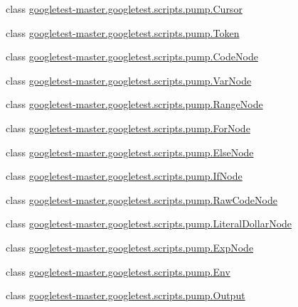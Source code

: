\begin{DoxyCompactItemize}
\item 
class \mbox{\hyperlink{classgoogletest-master_1_1googletest_1_1scripts_1_1pump_1_1_cursor}{googletest-\/master.\+googletest.\+scripts.\+pump.\+Cursor}}
\item 
class \mbox{\hyperlink{classgoogletest-master_1_1googletest_1_1scripts_1_1pump_1_1_token}{googletest-\/master.\+googletest.\+scripts.\+pump.\+Token}}
\item 
class \mbox{\hyperlink{classgoogletest-master_1_1googletest_1_1scripts_1_1pump_1_1_code_node}{googletest-\/master.\+googletest.\+scripts.\+pump.\+Code\+Node}}
\item 
class \mbox{\hyperlink{classgoogletest-master_1_1googletest_1_1scripts_1_1pump_1_1_var_node}{googletest-\/master.\+googletest.\+scripts.\+pump.\+Var\+Node}}
\item 
class \mbox{\hyperlink{classgoogletest-master_1_1googletest_1_1scripts_1_1pump_1_1_range_node}{googletest-\/master.\+googletest.\+scripts.\+pump.\+Range\+Node}}
\item 
class \mbox{\hyperlink{classgoogletest-master_1_1googletest_1_1scripts_1_1pump_1_1_for_node}{googletest-\/master.\+googletest.\+scripts.\+pump.\+For\+Node}}
\item 
class \mbox{\hyperlink{classgoogletest-master_1_1googletest_1_1scripts_1_1pump_1_1_else_node}{googletest-\/master.\+googletest.\+scripts.\+pump.\+Else\+Node}}
\item 
class \mbox{\hyperlink{classgoogletest-master_1_1googletest_1_1scripts_1_1pump_1_1_if_node}{googletest-\/master.\+googletest.\+scripts.\+pump.\+If\+Node}}
\item 
class \mbox{\hyperlink{classgoogletest-master_1_1googletest_1_1scripts_1_1pump_1_1_raw_code_node}{googletest-\/master.\+googletest.\+scripts.\+pump.\+Raw\+Code\+Node}}
\item 
class \mbox{\hyperlink{classgoogletest-master_1_1googletest_1_1scripts_1_1pump_1_1_literal_dollar_node}{googletest-\/master.\+googletest.\+scripts.\+pump.\+Literal\+Dollar\+Node}}
\item 
class \mbox{\hyperlink{classgoogletest-master_1_1googletest_1_1scripts_1_1pump_1_1_exp_node}{googletest-\/master.\+googletest.\+scripts.\+pump.\+Exp\+Node}}
\item 
class \mbox{\hyperlink{classgoogletest-master_1_1googletest_1_1scripts_1_1pump_1_1_env}{googletest-\/master.\+googletest.\+scripts.\+pump.\+Env}}
\item 
class \mbox{\hyperlink{classgoogletest-master_1_1googletest_1_1scripts_1_1pump_1_1_output}{googletest-\/master.\+googletest.\+scripts.\+pump.\+Output}}
\end{DoxyCompactItemize}

